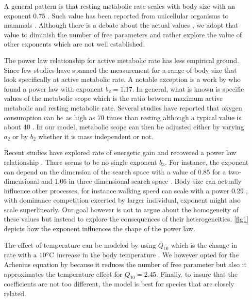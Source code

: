 A general pattern is that resting metabolic rate scales with body size with an exponent 0.75 \citep{Kleiber1947, Peters1986,Gillooly2001}.
Such value has been reported from unicellular organisms to mammals \citep{Brown2004}.
Although there is a debate about the actual values \citep[e.g.,][]{Isaac2010}, we adopt that value to diminish the number of free parameters and rather explore the value of other exponents which are not well established.

The power law relationship for active metabolic rate has less empirical ground.
Since few studies have spanned the measurement for a range of body size that look specifically at active metabolic rate.
A notable exception is a work by \citet{Bartholomew1978} who found a power law with exponent $b_2 = 1.17$.
In general, what is known is specific values of the metabolic scope which is the ratio between maximum active metabolic and resting metabolic rate.
Several studies have reported that oxygen consumption can be as high as 70 times than resting although a typical value is about 40 \citep{Bartholomew1981}.  
In our model, metabolic scope can then be adjusted either by varying $a_2$  or by $b_2$ whether it is mass independent or not. 

Recent studies have explored rate of energetic gain and recovered a power law relationship \citep{Pawar2012, Maino2015}.
There seems to be no single exponent $b_3$.
For instance, the exponent can depend on the dimension of the search space with a value of 0.85 for a two-dimensional and 1.06 in three-dimensional search space \citep{Pawar2012}.
Body size can actually influence other processes, for instance walking speed  can scale with a power 0.29 \citep{Peters1986}, with dominance competition excerted by larger individual, exponent might also scale superlinearly.
Our goal however is not to argue about the homogeneity of these values but instead to explore the consequences of their heterogeneities. %
\cref{fig1} depicts how the exponent influences the shape of the power law.

The effect of temperature can be modeled by using $Q_{10}$ which is the change in rate with a $10^ {\circ} \rm{C}$ increase in the body temperature \citep{Precht1973}.
We however opted for the Arhenius equation by \citet{Brown2004} because it reduces the number of free parameter but also it approximates the temperature effect for $Q_{10} = 2.45$.  
Finally, to  insure that the coefficients are not too different, the model is best for species that are closely related. 

